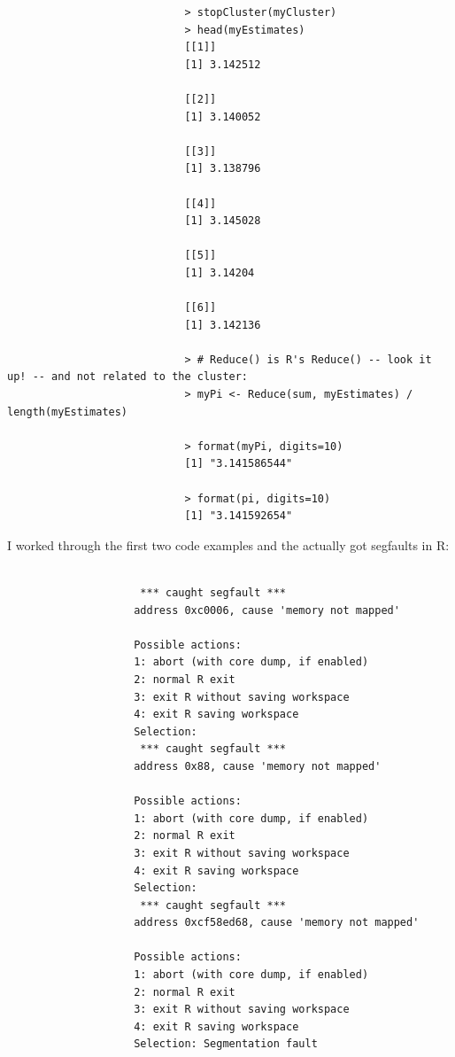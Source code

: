 \documentclass[a4paper, 11pt]{report}
\begin{document}
\begin{enumerate}
\begin{enumerate}
\begin{verbatim}
							> stopCluster(myCluster)
							> head(myEstimates)
							[[1]]
							[1] 3.142512
							 
							[[2]]
							[1] 3.140052
							 
							[[3]]
							[1] 3.138796
							 
							[[4]]
							[1] 3.145028
							 
							[[5]]
							[1] 3.14204
							 
							[[6]]
							[1] 3.142136
							 
							> # Reduce() is R's Reduce() -- look it up! -- and not related to the cluster:
							> myPi <- Reduce(sum, myEstimates) / length(myEstimates)
							 
							> format(myPi, digits=10)
							[1] "3.141586544"
							 
							> format(pi, digits=10)
							[1] "3.141592654"							
					\end{verbatim}	\normalsize		
					
					 I worked through the first two code examples and the actually got segfaults in R:
					 
					 \footnotesize\begin{verbatim}
					
					 *** caught segfault ***
					address 0xc0006, cause 'memory not mapped'
					
					Possible actions:
					1: abort (with core dump, if enabled)
					2: normal R exit
					3: exit R without saving workspace
					4: exit R saving workspace
					Selection:
					 *** caught segfault ***
					address 0x88, cause 'memory not mapped'
					
					Possible actions:
					1: abort (with core dump, if enabled)
					2: normal R exit
					3: exit R without saving workspace
					4: exit R saving workspace
					Selection:
					 *** caught segfault ***
					address 0xcf58ed68, cause 'memory not mapped'
					
					Possible actions:
					1: abort (with core dump, if enabled)
					2: normal R exit
					3: exit R without saving workspace
					4: exit R saving workspace
					Selection: Segmentation fault
					\end{verbatim}	\normalsize								
					
			\end{enumerate}					
			
	\end{enumerate}    	
	
	
\end{document}
